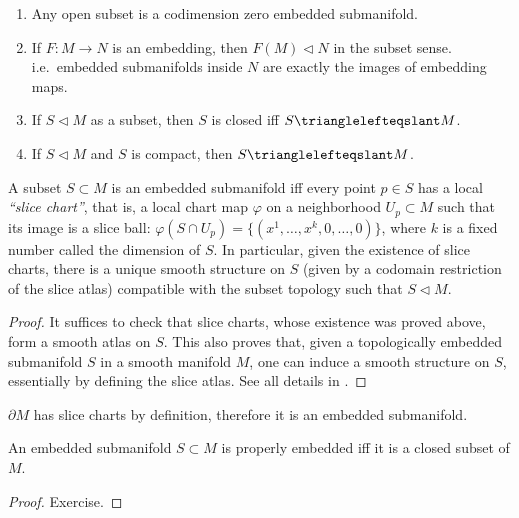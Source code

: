 \documentclass[english,letterpaper]{article}%
\numberwithin{equation}{section}
\numberwithin{figure}{section}
\numberwithin{table}{section}
\theoremstyle{definition}
\theoremstyle{definition}
\theoremstyle{definition}
\theoremstyle{plain}
\theoremstyle{plain}
\theoremstyle{plain}
\theoremstyle{plain}
\theoremstyle{remark}
\theoremstyle{remark}
\newcommand{\sub}{\vartriangleleft}
\newcommand{\sube}{\trianglelefteqslant}
\begin{document}
\begin{example}
\begin{enumerate}
    \item Any open subset is a codimension zero embedded submanifold.
    \item If $F:M\to N$ is an embedding, then $F(M)\sub N$ in the subset sense. i.e.\ embedded submanifolds inside $N$ are exactly the images of embedding maps.
    \item If $S\sub M$ as a subset, then $S$ is closed iff $S\sube M$.
    \item If $S\sub M$ and $S$ is compact, then $S\sube M$.
\end{enumerate}
\end{example}


\begin{prop}
A subset $S\subset M$ is an embedded submanifold iff every point $p\in S$ has a local \emph{``slice chart''}, that is, a local chart map $\varphi$ on a neighborhood $U_p\subset M$  such that its image is a slice ball: $\varphi(S\cap U_p)=\{(x^1,\ldots,x^k,0,\ldots,0)\}$, where $k$ is a fixed number called the dimension of $S$. In particular, given the existence of slice charts, there is a unique smooth structure on $S$ (given by a codomain restriction of the slice atlas) compatible with the subset topology such that $S\sub M$.
\end{prop}
\begin{proof}
It suffices to check that slice charts, whose existence was proved above, form a smooth atlas on $S$. This also proves that, given a topologically embedded submanifold $S$ in a smooth manifold $M$, one can induce a smooth structure on $S$, essentially by defining the slice atlas. See all details in \cite[Thm 5.8]{Lee}. 
\end{proof}


\begin{cor}
$\partial M$ has slice charts by definition, therefore it is an embedded submanifold.
\end{cor}

\begin{prop}
An embedded submanifold  $S\subset M$ is properly embedded iff it is a closed subset of $M$.
\end{prop}
\begin{proof}
Exercise.
\end{proof}
\end{document}
